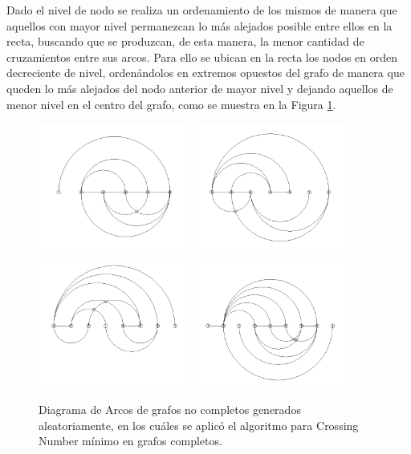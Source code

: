 	Dado el nivel de nodo se realiza un ordenamiento de los mismos de manera que aquellos con mayor nivel permanezcan lo más alejados posible entre ellos en la recta, buscando que se produzcan, de esta manera, la menor cantidad de cruzamientos entre sus arcos. Para ello se ubican en la recta los nodos en orden decreciente de nivel, ordenándolos en extremos opuestos del grafo de manera que queden lo más alejados del nodo anterior de mayor nivel y dejando aquellos de menor nivel en el centro del grafo, como se muestra en la Figura \ref{fig:arcdiagram_no_completo}.
	
	\begin{figure}[h]
		\centering
		\includegraphics[width=5cm]{imagenes/grafo_aleatorio_6_nodos_bn.png}
		\includegraphics[width=5cm]{imagenes/grafo_aleatorio_7_nodos_bn.png}\\
		\includegraphics[width=5cm]{imagenes/grafo_aleatorio_8_nodos_bn.png}
		\includegraphics[width=5cm]{imagenes/grafo_aleatorio_9_nodos_bn.png}
		\caption{Diagrama de Arcos de grafos no completos generados aleatoriamente, en los cuáles se aplicó el algoritmo para Crossing Number mínimo en grafos completos.}
		\label{fig:arcdiagram_no_completo}
	\end{figure}
	
